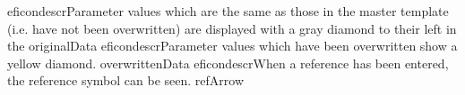 \begin{gdreficon}
  \app{}eficondescr{Parameter values which are the same as those in the master 
    template (i.e. 
    have not been overwritten) are displayed with a gray diamond to their left in 
    the \gdpropview{}}{originalData}
  \app{}eficondescr{Parameter values which have been overwritten show a yellow diamond. }{overwrittenData}
  \app{}eficondescr{When a reference has been entered, the reference symbol can be seen. }{refArrow}
\end{gdreficon}
